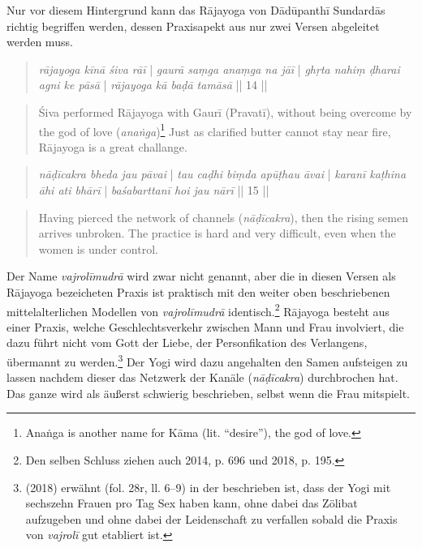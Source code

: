 Nur vor diesem Hintergrund kann das Rājayoga von Dādūpanthī Sundardās richtig begriffen werden, dessen Praxisapekt aus nur zwei Versen abgeleitet werden muss.

\begin{quote}
\textit{rājayoga kīnā śiva rāī} | \textit{gaurā saṃga anaṃga na jāī} |
\textit{ghṛta nahiṃ ḍharai agni ke pāsā} | \textit{rājayoga kā baḍā tamāsā} || 14 ||
\end{quote}
\begin{quote}
Śiva performed Rājayoga with Gaurī (Pravatī), without being overcome by the god of love (\textit{anaṅga})\footnote{Anaṅga is another name for Kāma (lit. ``desire''), the god of love.} Just as clarified butter cannot stay near fire, Rājayoga is a great challange.   
\end{quote}
\begin{quote}
\textit{nāḍīcakra bheda jau pāvai} | \textit{tau caḍhi biṃda apūṭhau āvai} | 
\textit{karanī kaṭhina āhi ati bhārī} | \textit{baśabarttanī hoi jau nārī} || 15 || 
\end{quote}
\begin{quote}
  Having pierced the network of channels (\textit{nāḍīcakra}), then the rising semen arrives unbroken.
  The practice is hard and very difficult, even when the women is under control. 
\end{quote}

Der Name \textit{vajrolīmudrā} wird zwar nicht genannt, aber die in diesen Versen als Rājayoga bezeicheten Praxis ist praktisch mit den weiter oben beschriebenen mittelalterlichen Modellen von \textit{vajrolīmudrā} identisch.\footnote{Den selben Schluss ziehen auch \citeauthor{burger2014sarvangayogapradipika} 2014, p. 696 und \citeauthor{mallinson2018vajrolimudra} 2018, p. 195.} Rājayoga besteht aus einer Praxis, welche Geschlechtsverkehr zwischen Mann und Frau involviert, die dazu führt nicht vom Gott der Liebe, der Personfikation des Verlangens, übermannt zu werden.\footnote{\citeauthor{mallinson2018vajrolimudra} (2018) erwähnt  (fol. 28r, ll. 6–9) in der beschrieben ist, dass der Yogi mit sechszehn Frauen pro Tag Sex haben kann, ohne dabei das Zölibat aufzugeben und ohne dabei der Leidenschaft zu verfallen sobald die Praxis von \textit{vajrolī} gut etabliert ist.} Der Yogi wird dazu angehalten den Samen aufsteigen zu lassen nachdem dieser das Netzwerk der Kanäle (\textit{nāḍīcakra}) durchbrochen hat. Das ganze wird als äußerst schwierig beschrieben, selbst wenn die Frau mitspielt.

